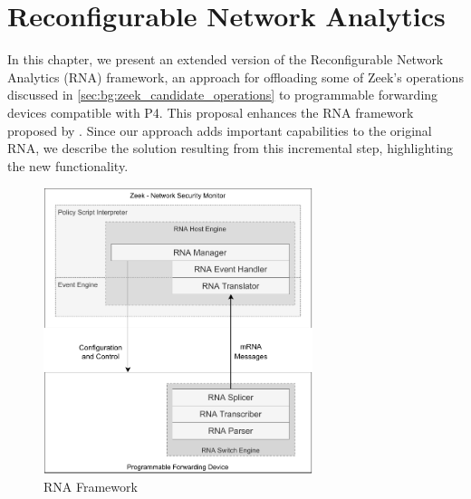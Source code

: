 \chapter{Reconfigurable Network Analytics}
\label{cap:rna}



In this chapter, we present an extended version of the Reconfigurable Network Analytics (RNA) framework, an approach for offloading some of Zeek's operations discussed in \autoref{sec:bg:zeek_candidate_operations} to programmable forwarding devices compatible with P4. This proposal enhances the RNA framework proposed by . Since our approach adds important capabilities to the original RNA, we describe the solution resulting from this incremental step, highlighting the new functionality.

\begin{figure}[h]
    \caption{RNA Framework}
    \begin{center}
        \includegraphics[width=0.7\textwidth]{images/arch_high_level.pdf}  
    \end{center}
    \label{fig:arch_high_level}
\end{figure}

